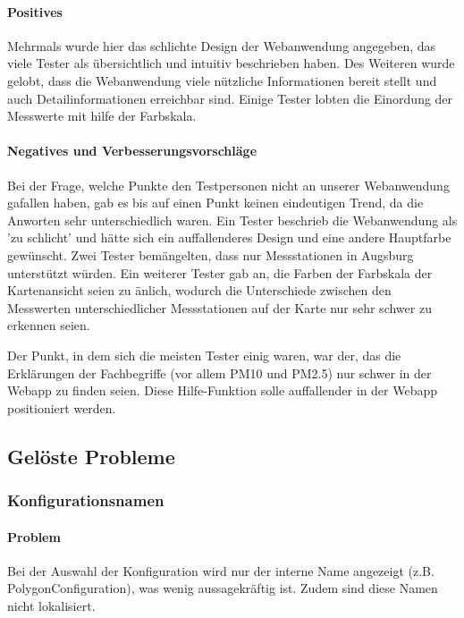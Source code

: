       \paragraph{Positives}
        Mehrmals wurde hier das schlichte Design der Webanwendung angegeben, das viele Tester als übersichtlich und intuitiv beschrieben haben.
        Des Weiteren wurde gelobt, dass die Webanwendung viele nützliche Informationen bereit stellt und auch Detailinformationen erreichbar sind.
        Einige Tester lobten die Einordung der Messwerte mit hilfe der Farbskala.
     
      \paragraph{Negatives und Verbesserungsvorschläge}
        Bei der Frage, welche Punkte den Testpersonen nicht an unserer Webanwendung gafallen haben, gab es bis auf einen Punkt keinen eindeutigen Trend, da die Anworten sehr unterschiedlich waren.
        Ein Tester beschrieb die Webanwendung als 'zu schlicht' und hätte sich ein auffallenderes Design und eine andere Hauptfarbe gewünscht.
        Zwei Tester bemängelten, dass nur Messstationen in Augsburg unterstützt würden.
        Ein weiterer Tester gab an, die Farben der Farbskala der Kartenansicht seien zu änlich, wodurch die Unterschiede zwischen den Messwerten unterschiedlicher Messstationen auf der Karte nur sehr schwer zu erkennen seien.
        
        Der Punkt, in dem sich die meisten Tester einig waren, war der, das die Erklärungen der Fachbegriffe (vor allem PM10 und PM2.5) nur schwer in der Webapp zu finden seien. Diese Hilfe-Funktion solle auffallender in der Webapp positioniert werden.

  \subsection{Gelöste Probleme}
    \subsubsection*{Konfigurationsnamen}
      \paragraph{Problem}
      Bei der Auswahl der Konfiguration wird nur der interne Name angezeigt (z.B. PolygonConfiguration),
      was wenig aussagekräftig ist. Zudem sind diese Namen nicht lokalisiert.

